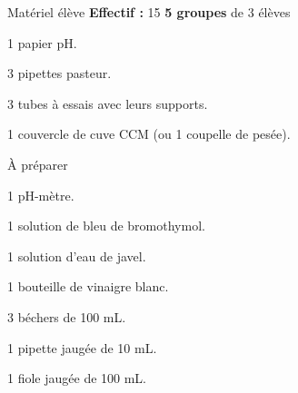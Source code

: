 
\begin{boiteMateriel}{Matériel élève}
  \textbf{Effectif :} 15
  \qq{}\qq{}
  \flecheLongue \textbf{5 groupes} de 3 élèves

  \begin{multicols}{2}
    \begin{protocole}
      \item 1 papier pH.
      \item 3 pipettes pasteur.
      \item 3 tubes à essais avec leurs supports.
      \item 1 couvercle de cuve CCM (ou 1 coupelle de pesée).
    \end{protocole}
  \end{multicols}
\end{boiteMateriel}


\begin{boiteMateriel}{À préparer}
    \begin{protocole}
      \item 1 pH-mètre.
      \item 1 solution de bleu de bromothymol.
      \item 1 solution d'eau de javel.
      \item 1 bouteille de vinaigre blanc.
      \item 3 béchers de 100 mL.
      \item 1 pipette jaugée de 10 mL.
      \item 1 fiole jaugée de 100 mL.
    \end{protocole}
\end{boiteMateriel}